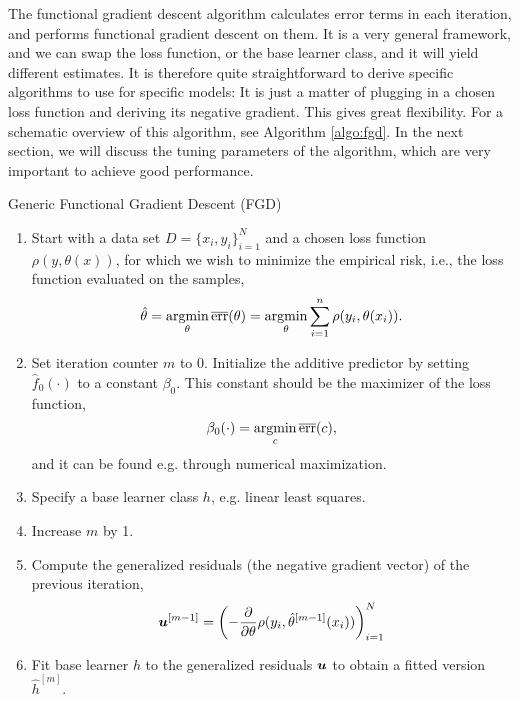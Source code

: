 The functional gradient descent algorithm calculates error terms in each iteration, and performs functional gradient descent on them.
It is a very general framework, and we can swap the loss function, or the base learner class, and it will yield different estimates.
It is therefore quite straightforward to derive specific algorithms to use for specific models:
It is just a matter of plugging in a chosen loss function and deriving its negative gradient.
This gives great flexibility.
For a schematic overview of this algorithm, see Algorithm \ref{algo:fgd}.
In the next section, we will discuss the tuning parameters of the algorithm, which are very important to achieve good performance.

\begin{algorithm}
\caption{Generic Functional Gradient Descent (FGD)}
\label{algo:fgd}
\begin{enumerate}
    \item
        Start with a data set $D=\{x_i, y_i\}_{i=1}^N$ and a chosen loss function $\rho(y,\theta(x))$, for which we wish to
        minimize the empirical risk, i.e., the loss function evaluated on the samples,
        \begin{equation*}
            \hat{\theta}=\operatorname*{argmin}_{\theta}\overline{\text{err}}(\theta)=\operatorname*{argmin}_{\theta}\sum_{i=1}^n\rho(y_{i},\theta(x_{i})).
        \end{equation*}
    \item
        Set iteration counter $m$ to 0.
        Initialize the additive predictor by setting $\hat{f}_0(\cdot)$ to a constant $\beta_0$.
        This constant should be the maximizer of the loss function,
        \begin{equation*}
            \beta_0(\cdot)=\operatorname*{argmin}_c \overline{\text{err}}(c),
        \end{equation*}
        and it can be found e.g. through numerical maximization.
    \item
        Specify a base learner class $h$, e.g. linear least squares.
    \item
        \label{algo-fgd-step-inc}
        Increase $m$ by 1.
    \item
        Compute the generalized residuals (the negative gradient vector) of the previous iteration,
        \begin{equation*}
            \bm{u}^{[m-1]}=\left(-\frac{\partial}{\partial \theta}\rho(y_i, \hat{\theta}^{[m-1]}(x_i))\right)_{i=1}^N
        \end{equation*}
    \item
        Fit base learner $h$ to the generalized residuals $\bm{u}$ to obtain a fitted version $\hat{h}^{[m]}$.

\end{enumerate}
\end{algorithm}
